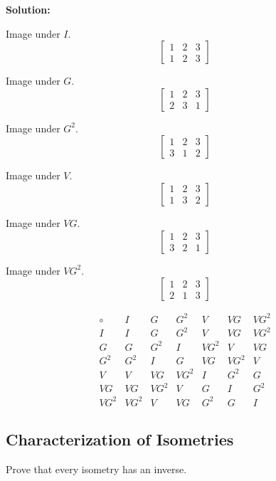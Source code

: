 \textbf{Solution:}

Image under $I$.
\[
\begin{bmatrix}
1 & 2 & 3 \\
1 & 2 & 3
\end{bmatrix}
\]

Image under $G$.
\[
\begin{bmatrix}
1 & 2 & 3 \\
2 & 3 & 1 
\end{bmatrix}
\]

Image under $G^2$.
\[
\begin{bmatrix}
1 & 2 & 3 \\
3 & 1 & 2
\end{bmatrix}
\]

Image under $V$.
\[
\begin{bmatrix}
1 & 2 & 3  \\
1 & 3 & 2
\end{bmatrix}
\]

Image under $VG$.
\[
\begin{bmatrix}
1 & 2 & 3  \\
3 & 2 & 1
\end{bmatrix}
\]

Image under $VG^2$.
\[
\begin{bmatrix}
1 & 2 & 3  \\
2 & 1 & 3
\end{bmatrix}
\]

\[
\begin{array}{c|cccccc}
\circ & I & G & G^2 & V & VG & VG^2 \\ \hline
I & I & G & G^2 & V & VG & VG^2 \\
G & G & G^2 & I & VG^2 & V & VG \\
G^2 & G^2 & I & G & VG & VG^2 & V \\
V & V & VG & VG^2 & I & G^2 & G \\
VG & VG & VG^2 & V & G & I & G^2 \\
VG^2 & VG^2 & V & VG & G^2 & G & I
\end{array}
\]

\subsection{Characterization of Isometries}

\begin{tcolorbox}[title=Problem 1, breakable]
    Prove that every isometry has an inverse.
\end{tcolorbox}

